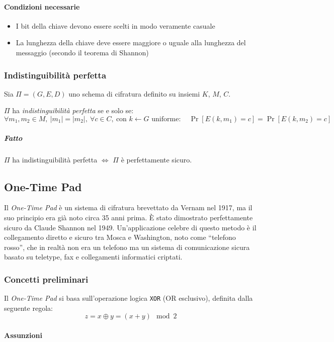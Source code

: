\documentclass{report}
\begin{document}
  \paragraph{Condizioni necessarie}
  \begin{itemize}
      \item I bit della chiave devono essere scelti in modo veramente casuale
      \item La lunghezza della chiave deve essere maggiore o uguale alla lunghezza del messaggio (secondo il teorema di Shannon)
  \end{itemize}
  
  \subsubsection{Indistinguibilità perfetta}
  Sia $\Pi = (G, E, D)$ uno schema di cifratura definito su insiemi $K$, $M$, $C$.
  
  $\Pi$ ha \emph{indistinguibilità perfetta} se e solo se:
  \[
  \forall m_1, m_2 \in M,\ |m_1| = |m_2|,\ \forall c \in C,\ \text{con } k \leftarrow G \text{ uniforme}:
  \quad \Pr[E(k, m_1) = c] = \Pr[E(k, m_2) = c]
  \]
  
  \subparagraph{Fatto}
  $\Pi$ ha indistinguibilità perfetta $\iff$ $\Pi$ è perfettamente sicuro.
  
            
    \subsection{One-Time Pad}
    Il \textit{One-Time Pad} è un sistema di cifratura brevettato da Vernam nel 1917, ma il suo principio era già noto circa 35 anni prima. È stato dimostrato perfettamente sicuro da Claude Shannon nel 1949. Un'applicazione celebre di questo metodo è il collegamento diretto e sicuro tra Mosca e Washington, noto come ``telefono rosso'', che in realtà non era un telefono ma un sistema di comunicazione sicura basato su teletype, fax e collegamenti informatici criptati.

    \subsubsection{Concetti preliminari}
    
    Il \textit{One-Time Pad} si basa sull'operazione logica \texttt{XOR} (OR esclusivo), definita dalla seguente regola:
    \[
    z = x \oplus y = (x + y) \mod 2
    \]
    
    \paragraph{Assunzioni}
    
\end{document}
